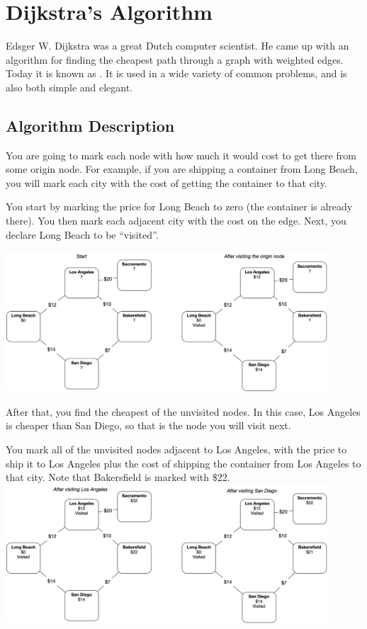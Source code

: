 \chapter{Dijkstra's Algorithm}

Edsger W. Dijkstra was a great Dutch computer scientist. He came up
with an algorithm for finding the cheapest path through a graph with
weighted edges. Today it is known as . It is used in a wide variety of common problems, and is
also both simple and elegant. 

\section{Algorithm Description}

You are going to mark each node with how much it would cost to get
there from some origin node.  For example, if you are shipping a
container from Long Beach, you will mark each city with the cost of
getting the container to that city.

You start by marking the price for Long Beach to zero (the container is already there). You then mark each adjacent city with the cost on
the edge. Next, you declare Long Beach to be ``visited''.

\includegraphics[width=0.9\textwidth]{step1.png}

After that, you find the cheapest of the unvisited nodes.  In this case, Los
Angeles is cheaper than San Diego, so that is the node you will visit
next.

You mark all of the unvisited nodes adjacent to Los Angeles, with the
price to ship it to Los Angeles plus the cost of shipping the
container from Los Angeles to that city. Note that Bakersfield is
marked with \$22.
\includegraphics[width=0.9\textwidth]{step2.png}

